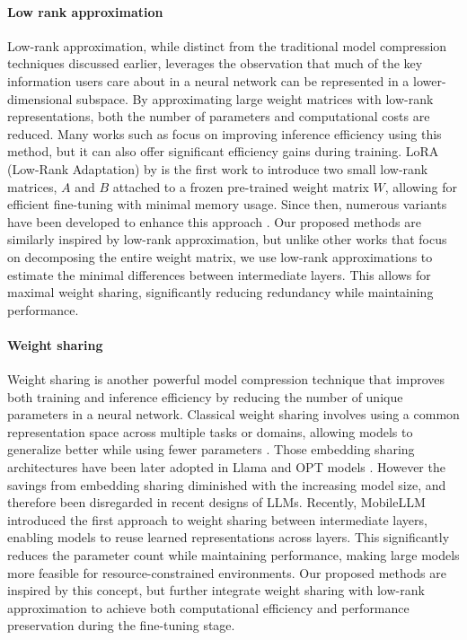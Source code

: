 \paragraph{Low rank approximation} 
Low-rank approximation, while distinct from the traditional model compression techniques discussed earlier, leverages the observation that much of the key information users care about in a neural network can be represented in a lower-dimensional subspace. By approximating large weight matrices with low-rank representations, both the number of parameters and computational costs are reduced. Many works such as \cite{li2023losparse,hsu2022language,hajimolahoseini2021compressing,tahaei2021kroneckerbert} focus on improving inference efficiency using this method, but it can also offer significant efficiency gains during training. LoRA (Low-Rank Adaptation) by \citet{hu2021lora} is the first work to introduce two small low-rank matrices, $A$ and $B$ attached to a frozen pre-trained weight matrix $W$, allowing for efficient fine-tuning with minimal memory usage. Since then, numerous variants have been developed to enhance this approach \citep{dettmers2022gpt3,sheng2023s, chen2023longlora,zhang2023adalora}. Our proposed methods are similarly inspired by low-rank approximation, but unlike other works that focus on decomposing the entire weight matrix, we use low-rank approximations to estimate the minimal differences between intermediate layers. This allows for maximal weight sharing, significantly reducing redundancy while maintaining performance.

\paragraph{Weight sharing}
Weight sharing is another powerful model compression technique that improves both training and inference efficiency by reducing the number of unique parameters in a neural network. Classical weight sharing involves using a common representation space across multiple tasks or domains, allowing models to generalize better while using fewer parameters \citep{liu2020microsoft,jiang2019multi,tars2018multi,fu2021learn}. Those embedding sharing architectures have been later adopted in Llama \citep{touvron2023llama} and OPT models \citep{zhang2022opt}. However the savings from embedding sharing diminished with the increasing model size, and therefore been disregarded in recent designs of LLMs. Recently, MobileLLM\citep{liu2024mobilellm} introduced the first approach to weight sharing between intermediate layers, enabling models to reuse learned representations across layers. This significantly reduces the parameter count while maintaining performance, making large models more feasible for resource-constrained environments. Our proposed methods are inspired by this concept, but further integrate weight sharing with low-rank approximation to achieve both computational efficiency and performance preservation during the fine-tuning stage.



